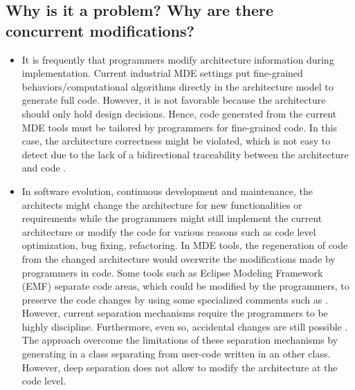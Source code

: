 \subsection{Why is it a problem? Why are there concurrent modifications?}
\label{subsec:reasons}

\noindent
{} 
\begin{itemize}
	\item It is frequently that programmers modify architecture information during implementation. %
	Current industrial MDE settings put fine-grained behaviors/computational algorithms directly in the architecture model to generate full code. 
	However, it is %
	not favorable because the architecture should only hold design decisions. 
	Hence, code generated from the current MDE tools must be tailored by programmers for fine-grained code.
	In this case, the architecture correctness might be violated, which is not easy to detect due to the lack of a bidirectional traceability between the architecture and code \cite{ubayashi2010archface}.
	
	
	
	\item In software evolution, continuous development and maintenance, the architects might change the architecture for new functionalities or requirements while the programmers might still implement the current architecture or modify the code for various reasons such as code level optimization, bug fixing, refactoring. 
	In MDE tools, the regeneration of code from the changed architecture would overwrite the modifications made by programmers in code. 
	Some tools such as Eclipse Modeling Framework (EMF) \cite{steinberg2008emf} separate code areas, which could be modified by the programmers, to preserve the code changes by using some specialized comments such as .
	However, current separation mechanisms require the programmers to be highly discipline.
	Furthermore, even so, accidental changes are still possible \cite{zheng2012enhancing}.
	The  approach \cite{zheng2012enhancing} overcome the limitations of these separation mechanisms by generating  in a class separating from user-code written in an other class.
	However, deep separation does not allow to modify the architecture at the code level.
\end{itemize} 


